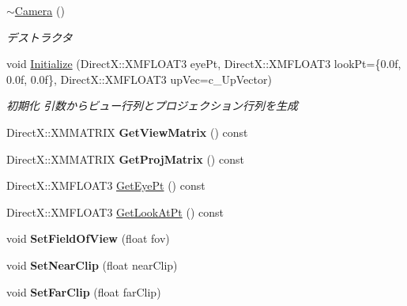 \begin{DoxyCompactItemize}
\item 
\hyperlink{class_camera_ab921e886e6f14e117eb8099ccb0a3775}{$\sim$\+Camera} ()\hypertarget{class_camera_ab921e886e6f14e117eb8099ccb0a3775}{}\label{class_camera_ab921e886e6f14e117eb8099ccb0a3775}

\begin{DoxyCompactList}\small\item\em デストラクタ \end{DoxyCompactList}\item 
void \hyperlink{class_camera_a6c93dc4a99a7b828fe37352e756e8df0}{Initialize} (Direct\+X\+::\+X\+M\+F\+L\+O\+A\+T3 eye\+Pt, Direct\+X\+::\+X\+M\+F\+L\+O\+A\+T3 look\+Pt=\{0.\+0f, 0.\+0f, 0.\+0f\}, Direct\+X\+::\+X\+M\+F\+L\+O\+A\+T3 up\+Vec=c\+\_\+\+Up\+Vector)
\begin{DoxyCompactList}\small\item\em 初期化  引数からビュー行列とプロジェクション行列を生成 \end{DoxyCompactList}\item 
Direct\+X\+::\+X\+M\+M\+A\+T\+R\+IX {\bfseries Get\+View\+Matrix} () const \hypertarget{class_camera_ac52f3bff4cb1522f3b5c5046cf69003f}{}\label{class_camera_ac52f3bff4cb1522f3b5c5046cf69003f}

\item 
Direct\+X\+::\+X\+M\+M\+A\+T\+R\+IX {\bfseries Get\+Proj\+Matrix} () const \hypertarget{class_camera_a548bbd779fcad1c6ba5bd12dabf92560}{}\label{class_camera_a548bbd779fcad1c6ba5bd12dabf92560}

\item 
Direct\+X\+::\+X\+M\+F\+L\+O\+A\+T3 \hyperlink{class_camera_af17532083692430478b8fd5006f30f0d}{Get\+Eye\+Pt} () const 
\item 
Direct\+X\+::\+X\+M\+F\+L\+O\+A\+T3 \hyperlink{class_camera_aa387eb16c079b628eb624e44467bf759}{Get\+Look\+At\+Pt} () const 
\item 
void {\bfseries Set\+Field\+Of\+View} (float fov)\hypertarget{class_camera_ab4c76305c15469fbe4eb04a493bc7b8a}{}\label{class_camera_ab4c76305c15469fbe4eb04a493bc7b8a}

\item 
void {\bfseries Set\+Near\+Clip} (float near\+Clip)\hypertarget{class_camera_a3e28bf6a3f046b81b863e23b967db7a2}{}\label{class_camera_a3e28bf6a3f046b81b863e23b967db7a2}

\item 
void {\bfseries Set\+Far\+Clip} (float far\+Clip)\hypertarget{class_camera_aecdc7fb7d7e3c7469b8e28d845a35b68}{}\label{class_camera_aecdc7fb7d7e3c7469b8e28d845a35b68}

\end{DoxyCompactItemize}
